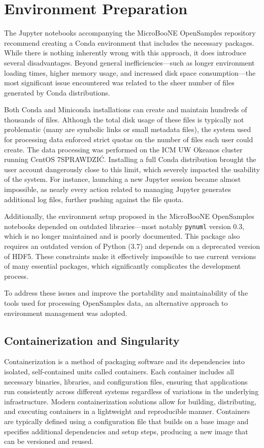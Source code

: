 \documentclass{pracalicmgr}
\begin{document}
\section{Environment Preparation}

The Jupyter notebooks accompanying the MicroBooNE OpenSamples repository recommend creating a Conda environment that includes the necessary packages. While there is nothing inherently wrong with this approach, it does introduce several disadvantages. Beyond general inefficiencies—such as longer environment loading times, higher memory usage, and increased disk space consumption—the most significant issue encountered was related to the sheer number of files generated by Conda distributions.

Both Conda and Miniconda installations can create and maintain hundreds of thousands of files. Although the total disk usage of these files is typically not problematic (many are symbolic links or small metadata files), the system used for processing data enforced strict quotas on the number of files each user could create. The data processing was performed on the ICM UW Okeanos cluster running CentOS 7{SPRAWDZIĆ}. Installing a full Conda distribution brought the user account dangerously close to this limit, which severely impacted the usability of the system. For instance, launching a new Jupyter session became almost impossible, as nearly every action related to managing Jupyter generates additional log files, further pushing against the file quota.

Additionally, the environment setup proposed in the MicroBooNE OpenSamples notebooks depended on outdated libraries—most notably \texttt{pynuml} version 0.3, which is no longer maintained and is poorly documented. This package also requires an outdated version of Python (3.7) and depends on a deprecated version of HDF5. These constraints make it effectively impossible to use current versions of many essential packages, which significantly complicates the development process.

To address these issues and improve the portability and maintainability of the tools used for processing OpenSamples data, an alternative approach to environment management was adopted.

\subsection{Containerization and Singularity}

Containerization is a method of packaging software and its dependencies into isolated, self-contained units called containers. Each container includes all necessary binaries, libraries, and configuration files, ensuring that applications run consistently across different systems regardless of variations in the underlying infrastructure. Modern containerization solutions allow for building, distributing, and executing containers in a lightweight and reproducible manner. Containers are typically defined using a configuration file that builds on a base image and specifies additional dependencies and setup steps, producing a new image that can be versioned and reused.
\end{document}
